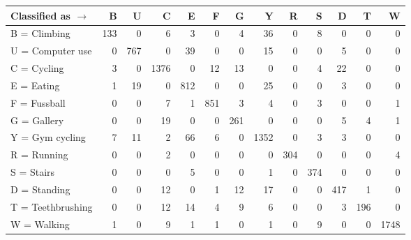\begin{tabular}{lrrrrrrrrrrrr}
\toprule
Classified as $\rightarrow$ &    B &    U &     C &    E &    F &    G &     Y &    R &    S &    D &    T &     W \\
\midrule
B = Climbing      &  133 &    0 &     6 &    3 &    0 &    4 &    36 &    0 &    8 &    0 &    0 &     0 \\
U = Computer use  &    0 &  767 &     0 &   39 &    0 &    0 &    15 &    0 &    0 &    5 &    0 &     0 \\
C = Cycling       &    3 &    0 &  1376 &    0 &   12 &   13 &     0 &    0 &    4 &   22 &    0 &     0 \\
E = Eating        &    1 &   19 &     0 &  812 &    0 &    0 &    25 &    0 &    0 &    3 &    0 &     0 \\
F = Fussball      &    0 &    0 &     7 &    1 &  851 &    3 &     4 &    0 &    3 &    0 &    0 &     1 \\
G = Gallery       &    0 &    0 &    19 &    0 &    0 &  261 &     0 &    0 &    0 &    5 &    4 &     1 \\
Y = Gym cycling   &    7 &   11 &     2 &   66 &    6 &    0 &  1352 &    0 &    3 &    3 &    0 &     0 \\
R = Running       &    0 &    0 &     2 &    0 &    0 &    0 &     0 &  304 &    0 &    0 &    0 &     4 \\
S = Stairs        &    0 &    0 &     0 &    5 &    0 &    0 &     1 &    0 &  374 &    0 &    0 &     0 \\
D = Standing      &    0 &    0 &    12 &    0 &    1 &   12 &    17 &    0 &    0 &  417 &    1 &     0 \\
T = Teethbrushing &    0 &    0 &    12 &   14 &    4 &    9 &     6 &    0 &    0 &    3 &  196 &     0 \\
W = Walking       &    1 &    0 &     9 &    1 &    1 &    0 &     1 &    0 &    9 &    0 &    0 &  1748 \\
\bottomrule
\end{tabular}
